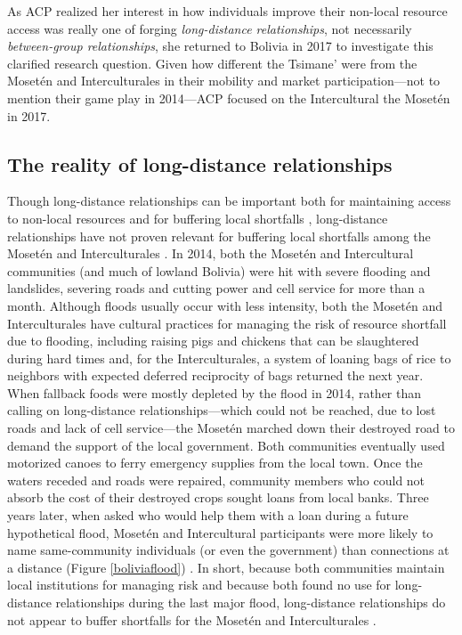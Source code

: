 \documentclass[bibauthoryear]{aa}
\begin{document}
As ACP realized her interest in how individuals improve their non-local resource access was really one of forging \textit{long-distance relationships}, not necessarily \textit{between-group relationships}, she returned to Bolivia in 2017 to investigate this clarified research question. Given how different the Tsimane’ were from the Mosetén and Interculturales in their mobility and market participation---not to mention their game play in 2014---ACP focused on the Intercultural the Moset\'en in 2017.
	
	\subsection{The reality of long-distance relationships}\label{distance}
	Though long-distance relationships can be important both for maintaining access to non-local resources and for buffering local shortfalls \citep{pisor2019evolution}, long-distance relationships have not proven relevant for buffering local shortfalls among the Moset\'en and Interculturales \citep{pisorjones2020}. In 2014, both the Moset\'en and Intercultural communities (and much of lowland Bolivia) were hit with severe flooding and landslides, severing roads and cutting power and cell service for more than a month. Although floods usually occur with less intensity, both the Moset\'en and Interculturales have cultural practices for managing the risk of resource shortfall due to flooding, including raising pigs and chickens that can be slaughtered during hard times and, for the Interculturales, a system of loaning bags of rice to neighbors with expected deferred reciprocity of bags returned the next year. When fallback foods were mostly depleted by the flood in 2014, rather than calling on long-distance relationships---which could not be reached, due to lost roads and lack of cell service---the Moset\'en marched down their destroyed road to demand the support of the local government. Both communities eventually used motorized canoes to ferry emergency supplies from the local town. Once the waters receded and roads were repaired, community members who could not absorb the cost of their destroyed crops sought loans from local banks. Three years later, when asked who would help them with a loan during a future hypothetical flood, Moset\'en and Intercultural participants were more likely to name same-community individuals (or even the government) than connections at a distance (Figure \ref{boliviaflood}) \citep{pisorjones2020}. In short, because both communities maintain local institutions for managing risk and because both found no use for long-distance relationships during the last major flood, long-distance relationships do not appear to buffer shortfalls for the Moset\'en and Interculturales \citep{pisorjones2020}.
\end{document}
